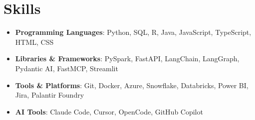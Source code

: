 \documentclass[letterpaper,11pt]{article}
\newcommand{\resumeItem}[2]{
  \item\small{
    \textbf{#1}{: #2 \vspace{-2pt}}
  }
}
\newcommand{\resumeSubItem}[2]{\resumeItem{#1}{#2}\vspace{-4pt}}
\newcommand{\resumeSubHeadingListStart}{\begin{itemize}[leftmargin=*]}
\newcommand{\resumeSubHeadingListEnd}{\end{itemize}}
\begin{document}
\section{Skills}
 \resumeSubHeadingListStart
   \resumeSubItem{Programming Languages}{Python, SQL, R, Java, JavaScript, TypeScript, HTML, CSS}
   \resumeSubItem{Libraries \& Frameworks}{PySpark, FastAPI, LangChain, LangGraph, Pydantic AI, FastMCP, Streamlit}
   \resumeSubItem{Tools \& Platforms}{Git, Docker, Azure, Snowflake, Databricks, Power BI, Jira, Palantir Foundry}
  \resumeSubItem{AI Tools}{Claude Code, Cursor, OpenCode, GitHub Copilot}
 \resumeSubHeadingListEnd


\end{document}
